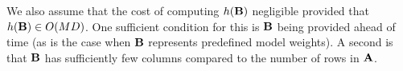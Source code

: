 We also assume that the cost of computing $h(\mathbf{B})$ negligible provided that $h(\mathbf{B}) \in O(MD)$. One sufficient condition for this is $\mathbf{B}$ being provided ahead of time (as is the case when $\mathbf{B}$ represents predefined model weights). A second is that $\mathbf{B}$ has sufficiently few columns compared to the number of rows in $\mathbf{A}$.

















